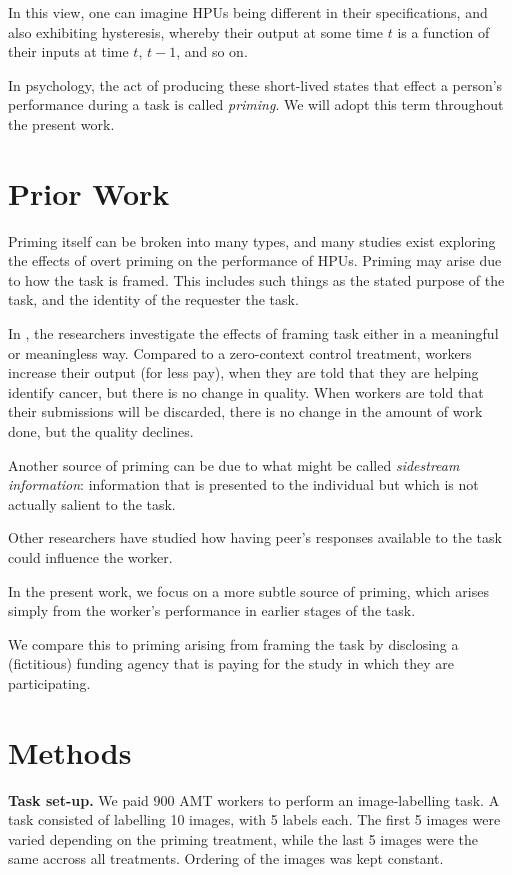 \documentclass[letterpaper, 11pt, twocolumn]{article}
\begin{document}
In this view, one can imagine HPUs being different in their specifications,
and also exhibiting hysteresis, whereby their output at some time $t$ is a
function of their inputs at time $t$, $t-1$, and so on.

In psychology, the act of producing these short-lived states that effect a
person's performance during a task is called \textit{priming}.  We will adopt
this term throughout the present work.


\section*{Prior Work}
Priming itself can be broken into many types, and many studies exist exploring
the effects of overt priming on the performance of HPUs. Priming may arise
due to how the task is framed.  This includes such things as the stated
purpose of the task, and the identity of the requester the task.

In \cite{chandler2013breaking}, the researchers investigate the effects of 
framing task either in a meaningful or meaningless way.  Compared to a 
zero-context control treatment, workers increase their output (for less pay),
when they are told that they are helping identify cancer, but there is no
change in quality.  When workers are told that their submissions will be 
discarded, there is no change in the amount of work done, but the quality 
declines.

Another source of priming can be due to what might be called 
\textit{sidestream information}: information that is presented to the 
individual but which is not actually salient to the task.

Other researchers have studied how having peer's responses available to 
the task could influence the worker.

In the present work, we focus on a more subtle source of priming, which arises
simply from the worker's performance in earlier stages of the task. 

We compare this to priming arising from framing the task by disclosing a 
(fictitious) funding agency that is paying for the study in which they are 
participating.

\section*{Methods}

\textbf{Task set-up.}
We paid 900 AMT workers to perform an image-labelling task.  A task consisted 
of labelling 10 images, with 5 labels each.  The first 5 images were varied 
depending on the priming treatment, while the last 5 images were the same 
accross all treatments.  Ordering of the images was kept constant.
\end{document}
